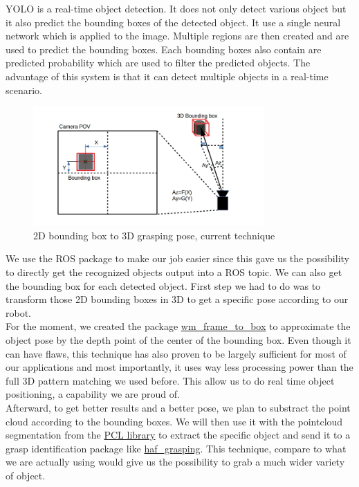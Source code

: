 \documentclass[runningheads,a4paper]{llncs}
\begin{document}
YOLO is a real-time object detection. It does not only detect various object but it also predict the bounding boxes of the detected object. It use a single neural network which is applied to the image. Multiple regions are then created and are used to predict the bounding boxes. Each bounding boxes also contain are predicted probability which are used to filter the predicted objects. The advantage of this system is that it can detect multiple objects in a real-time scenario.\\
 
\begin{figure}
  \centering
  \includegraphics[width=250pt]{images/frame_to_box.png}
  \caption{2D bounding box to 3D grasping pose, current technique}
\end{figure} 
 
We use the ROS package to make our job easier since this gave us the possibility to directly get the recognized objects output into a ROS topic. We can also get the bounding box for each detected object. First step we had to do was to transform those 2D bounding boxes in 3D to get a specific pose according to our robot. \\

For the moment, we created the package \href{https://github.com/WalkingMachine/wm_frame_to_box}{wm\_frame\_to\_box} to approximate the object pose by the depth point of the center of the bounding box. Even though it can have flaws, this technique has also proven to be largely sufficient for most of our applications and most importantly, it uses way less processing power than the full 3D pattern matching we used before. This allow us to do real time object positioning, a capability we are proud of.\\

Afterward, to get better results and a better pose, we plan to substract the point cloud according to the bounding boxes. We will then use it with the pointcloud segmentation from the \href{http://pointclouds.org}{PCL library} to extract the specific object and send it to a grasp identification package like \href{http://http://wiki.ros.org/haf_grasping}{haf\_grasping}. This technique, compare to what we are actually using would give us the possibility to grab a much wider variety of object.\\
\end{document}
